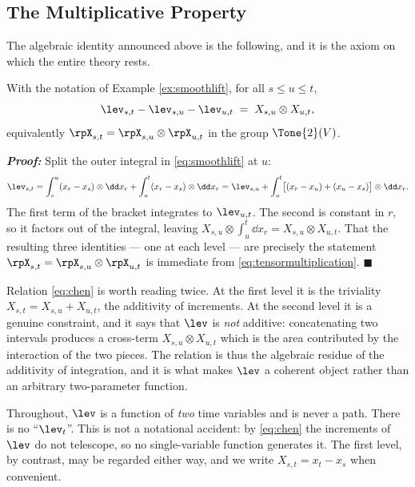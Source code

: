 \subsection{The Multiplicative Property}\label{subsec:multiplicative}

The algebraic identity announced above is the following, and it is the axiom on which the entire
theory rests.

\begin{proposition}\label{prop:chensmooth}
With the notation of Example \ref{ex:smoothlift}, for all $s \leq u \leq t$,
\begin{equation}\label{eq:chen}
\lev_{s,t} - \lev_{s,u} - \lev_{u,t} \;=\; X_{s,u}\otimes X_{u,t},
\end{equation}
equivalently $\rpX_{s,t} = \rpX_{s,u}\otimes\rpX_{u,t}$ in the group $\Tone{2}(V)$.
\end{proposition}

\textbf{\textit{Proof:}} Split the outer integral in \eqref{eq:smoothlift} at $u$:
\[
\lev_{s,t} = \int_s^u (x_r - x_s)\otimes \dd x_r + \int_u^t (x_r-x_s)\otimes \dd x_r
= \lev_{s,u} + \int_u^t \bigl[(x_r - x_u) + (x_u - x_s)\bigr]\otimes \dd x_r .
\]
The first term of the bracket integrates to $\lev_{u,t}$. The second is constant in $r$, so it
factors out of the integral, leaving $X_{s,u}\otimes\int_u^t \dd x_r = X_{s,u}\otimes X_{u,t}$. That
the resulting three identities --- one at each level --- are precisely the statement
$\rpX_{s,t} = \rpX_{s,u}\otimes\rpX_{u,t}$ is immediate from \eqref{eq:tensormultiplication}.
\hfill $\blacksquare$

\medskip

Relation \eqref{eq:chen} is worth reading twice. At the first level it is the triviality
$X_{s,t} = X_{s,u} + X_{u,t}$, the additivity of increments. At the second level it is a genuine
constraint, and it says that $\lev$ is \emph{not} additive: concatenating two intervals produces a
cross-term $X_{s,u}\otimes X_{u,t}$ which is the area contributed by the interaction of the two
pieces. The relation is thus the algebraic residue of the additivity of integration, and it is what
makes $\lev$ a coherent object rather than an arbitrary two-parameter function.

\begin{notationbox}
Throughout, $\lev$ is a function of \emph{two} time variables and is never a path. There is no
``$\lev_t$''. This is not a notational accident: by \eqref{eq:chen} the increments of $\lev$ do not
telescope, so no single-variable function generates it. The first level, by contrast, may be
regarded either way, and we write $X_{s,t} = x_t - x_s$ when convenient.
\end{notationbox}

